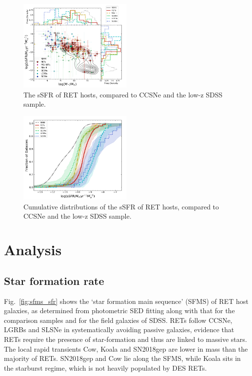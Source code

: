 \documentclass[fleqn,usenatbib,]{mnras}
\newcommand{\replychris}[1]{\color{magenta}#1 \color{black}}
\begin{document}
\begin{figure}
\includegraphics[width=0.5\textwidth]{figs/sSFR_Mike.png}
\caption{The sSFR of RET hosts, compared to CCSNe and the low-z SDSS sample.
\label{fig:sfms_ssfr}}
\end{figure}

\begin{figure}
\includegraphics[width=0.5\textwidth]{figs/cum_sSFR_mike.png}
\caption{Cumulative distributions of the sSFR of RET hosts, compared to CCSNe and the low-z SDSS sample.
\label{fig:ssfr_cum}}
\end{figure}

\section{Analysis}
\label{sec:analysis} %

\subsection{Star formation rate \label{subsec:res_sfr}}
Fig.~\ref{fig:sfms_sfr} shows the `star formation main sequence' (SFMS) of RET host galaxies, \replychris{as determined from photometric SED fitting} along with that for the comparison samples and for the field galaxies of SDSS. RETs follow CCSNe, LGRBs and SLSNe in systematically avoiding passive galaxies, evidence that RETs require the presence of star-formation and thus are linked to massive stars. The local rapid transients Cow, Koala and SN2018gep \replychris{are lower in mass than the majority of RETs. SN2018gep and Cow lie along the SFMS, while Koala sits in the starburst regime, which is not heavily populated by DES RETs.} 
\end{document}
